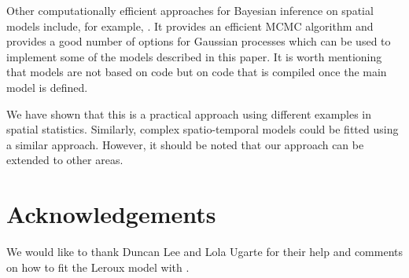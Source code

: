 \documentclass[article]{jss}
\begin{document}
Other computationally efficient approaches for Bayesian inference on spatial 
models include, for example,  \citep{stan-software:2013}.
It provides an efficient MCMC algorithm and provides a good number of options
for Gaussian processes which can be used to implement some of the models
described in this paper. It is worth mentioning that  models are not
based on  code but on  code that is compiled once the main
model is defined.

We have shown that this is a practical approach using different examples in
spatial statistics. Similarly, complex spatio-temporal models could be fitted
using a similar approach. However, it should be noted that our approach can be
extended to other areas.

\section{Acknowledgements}

We would like to thank Duncan Lee and Lola Ugarte for their help and comments
on how to fit the Leroux model with .


%

\end{document}

